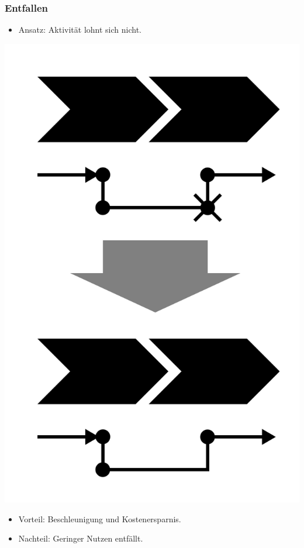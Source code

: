 \documentclass{beamer}
\begin{document}
 \begin{frame}
  \frametitle{Entfallen}
   \begin{itemize}
    \item Ansatz: Aktivität lohnt sich nicht.
   \end{itemize}
  \centerline{\includegraphics[scale=2.5]{4_6_1.png}}
  \begin{itemize}
    \item Vorteil: Beschleunigung und Kostenersparnis.
    \item Nachteil: Geringer Nutzen entfällt.
  \end{itemize}
 \end{frame}
\end{document}
